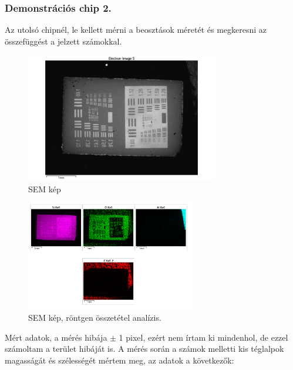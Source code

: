\documentclass[a4paper,12pt]{article}
\begin{document}
\subsubsection{ Demonstrációs chip 2.}

\par Az utolsó chipnél, le kellett mérni a beosztások méretét és
megkeresni az összefüggést a jelzett számokkal.

\begin{figure}[H]
	\centering
	\includegraphics[width=0.75\textwidth]{./Jcsop/chip2.png}
	\caption{SEM kép}
\end{figure}

\begin{figure}[H]
	\centering
	\includegraphics[width=0.66\textwidth]{./Jcsop/chip2rtg.png}
	\caption{SEM kép, röntgen összetétel analízis.}
\end{figure}

\par Mért adatok, a mérés hibája $\pm$ 1 pixel, 
ezért nem írtam ki mindenhol, de ezzel számoltam a terület hibáját is.
A mérés során a számok melletti kis téglalpok magasságát és szélességét mértem meg, az adatok a következők:
\end{document}
